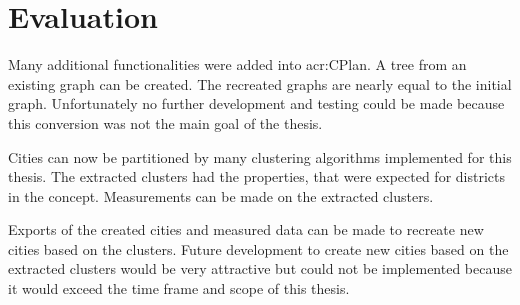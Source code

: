 \chapter{Evaluation}
Many additional functionalities were added into \acrshort{acr:CPlan}. A tree from an existing graph can be created. The recreated graphs are nearly equal to the initial graph. Unfortunately no further development and testing could be made because this conversion was not the main goal of the thesis.

Cities can now be partitioned by many clustering algorithms implemented for this thesis. The extracted clusters had the properties, that were expected for districts in the concept. Measurements can be made on the extracted clusters.

Exports of the created cities and measured data can be made to recreate new cities based on the clusters. Future development to create new cities based on the extracted clusters would be very attractive but could not be implemented because it would exceed the time frame and scope of this thesis.
